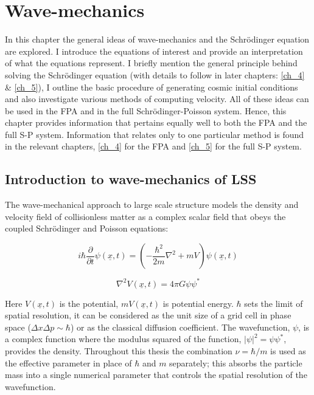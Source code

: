 \chapter{Wave-mechanics}
\label{ch_3}
In this chapter the general ideas of wave-mechanics and the Schr\"odinger equation are explored. I introduce the equations of interest and provide an interpretation of what the equations represent. I briefly mention the general principle behind solving the Schr\"odinger equation (with details to follow in later chapters: \ref{ch_4} \& \ref{ch_5}), I outline the basic procedure of generating cosmic initial conditions and also investigate various methods of computing velocity. All of these ideas can be used in the FPA and in the full Schr\"odinger-Poisson system. Hence, this chapter provides information that pertains equally well to both the FPA and the full S-P system. Information that relates only to one particular method is found in the relevant chapters, \ref{ch_4} for the FPA and \ref{ch_5} for the full S-P system.

\section{Introduction to wave-mechanics of LSS}
%
%

The wave-mechanical approach to large scale structure models the density and velocity field of collisionless matter as a complex scalar field that obeys the coupled Schr\"odinger and Poisson equations:

\begin{equation}
\label{eqn_schroedinger}
 i\hbar\frac{\partial}{\partial t}\psi(\underline{x},t) = \left( -\frac{\hbar^2}{2m} \nabla^2 + mV \right) \psi(\underline{x},t)
\end{equation}

\begin{equation}
\label{eqn_poi}
\nabla^2 V(\underline{x},t) = 4\pi G \psi\psi^*
\end{equation}

\noindent Here $V(\underline{x},t)$ is the potential, $m V(\underline{x},t)$ is potential energy. $\hbar$ sets the limit of spatial resolution, it can be considered  as the unit size of a grid cell in phase space ($\Delta x \Delta p \sim \hbar$) or as the classical diffusion coefficient. The wavefunction, $\psi$, is a complex function where the modulus squared of the function, $|\psi|^2 = \psi \psi^*$, provides the density. Throughout this thesis the combination $\nu = \hbar/m$ is used as the effective parameter in place of $\hbar$ and $m$ separately; this absorbs the particle mass into a single numerical parameter that controls the spatial resolution of the wavefunction.

